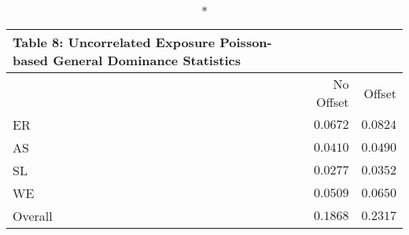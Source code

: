 \begin{longtable}{l|rr}
\caption*{
{\large Table 8: Uncorrelated Exposure Poisson-based General Dominance Statistics}
} \\ 
\toprule
\multicolumn{1}{l}{} & No Offset & Offset \\ 
\midrule
ER & $0.0672$ & $0.0824$ \\ 
AS & $0.0410$ & $0.0490$ \\ 
SL & $0.0277$ & $0.0352$ \\ 
WE & $0.0509$ & $0.0650$ \\ 
Overall & $0.1868$ & $0.2317$ \\ 
\bottomrule
\end{longtable}

